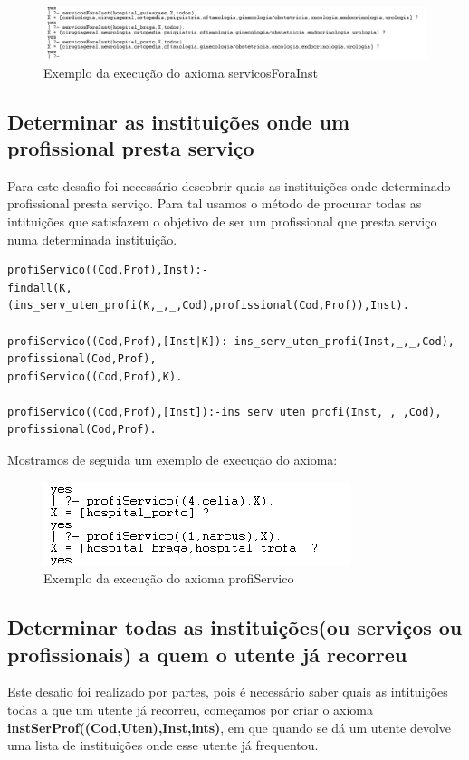 \begin{figure}[<+htpb+>]
	\centering
	\includegraphics[scale=0.6]{answer6.png}
	\caption{Exemplo da execução do axioma servicosForaInst}
	\label{p3:fig:output6}
\end{figure}

\subsection{Determinar as instituições onde um profissional presta serviço }
Para este desafio foi necessário descobrir quais as instituições onde determinado profissional presta serviço. Para tal usamos o método de procurar todas as intituições que satisfazem o objetivo de ser um profissional que presta serviço numa determinada instituição. 
\begin{verbatim}
profiServico((Cod,Prof),Inst):- 
findall(K,(ins_serv_uten_profi(K,_,_,Cod),profissional(Cod,Prof)),Inst).

profiServico((Cod,Prof),[Inst|K]):-ins_serv_uten_profi(Inst,_,_,Cod),
profissional(Cod,Prof),
profiServico((Cod,Prof),K).

profiServico((Cod,Prof),[Inst]):-ins_serv_uten_profi(Inst,_,_,Cod),
profissional(Cod,Prof).
\end{verbatim}
Mostramos de seguida um exemplo de execução do axioma: 

\begin{figure}[<+htpb+>]
	\centering
	\includegraphics[scale=0.9]{answer7.png}
	\caption{Exemplo da execução do axioma profiServico}
	\label{p3:fig:output7}
\end{figure}

\subsection{Determinar todas as instituições(ou serviços ou profissionais) a quem o utente já recorreu}

Este desafio foi realizado por partes, pois é necessário saber quais as intituições todas a que um utente já recorreu, começamos por criar o axioma \textbf{instSerProf((Cod,Uten),Inst,ints)}, em que quando se dá um utente devolve uma lista de instituições onde esse utente já frequentou. 

